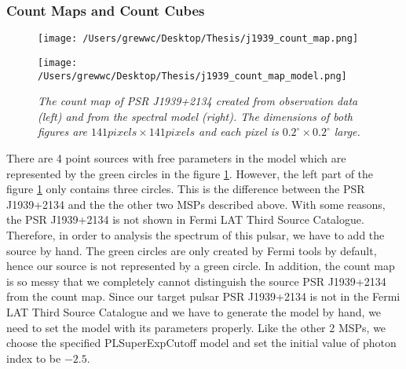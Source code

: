 \documentclass[12pt]{report}
\newcommand{\mycaption}[1]{\caption{\textit{\footnotesize #1}}}
\begin{document}
          \subsubsection{Count Maps and Count Cubes}
          \begin{figure}[!ht]
            \begin{center}
            \begin{minipage}{0.45\textwidth}
              \begin{center} 
                \texttt{[image: /Users/grewwc/Desktop/Thesis/j1939\_count\_map.png]}
              \end{center}
            \end{minipage}
            \begin{minipage}{0.45\textwidth}
              \begin{center}
                \texttt{[image: /Users/grewwc/Desktop/Thesis/j1939\_count\_map\_model.png]}
              \end{center}
            \end{minipage}
          \end{center}

            \centering
            \begin{minipage}{\textwidth}
              \mycaption{The count map of PSR J1939+2134 created from observation 
              data (\textsf{left}) and from the spectral model (\textsf{right}). The dimensions
              of both figures are $141 pixels \times 141 pixels$ and each pixel is 
              $0.2^{\circ}\times0.2^{\circ}$ large.}
              \label{fig: j1939_count_map}
            \end{minipage}
          \end{figure}
          \vspace{1cm}

          There are 4 point sources with free parameters in the model which are represented by the green 
          circles in the figure \ref{fig: j1939_count_map}.
          However, the left part of the figure \ref{fig: j1939_count_map} only contains three circles.
          This is the difference between the PSR J1939+2134 and the the other two MSPs described 
          above. With some reasons, the PSR J1939+2134 is not shown in Fermi LAT Third Source Catalogue.
          Therefore, in order to analysis the spectrum of this pulsar, we have to add the source 
          by hand. The green circles are only created by Fermi tools by default, hence our source is 
          not represented by a green circle. In addition, the count map is so messy that we completely 
          cannot distinguish the source PSR J1939+2134 from the count map. 
          Since our target pulsar PSR J1939+2134 is not in the Fermi LAT Third Source Catalogue and 
          we have to generate the model by hand, we need to set the model with its parameters properly.
          Like the other 2 MSPs, we choose the specified PLSuperExpCutoff model and set the initial value 
          of photon index to be $-2.5$.
          
\end{document}

